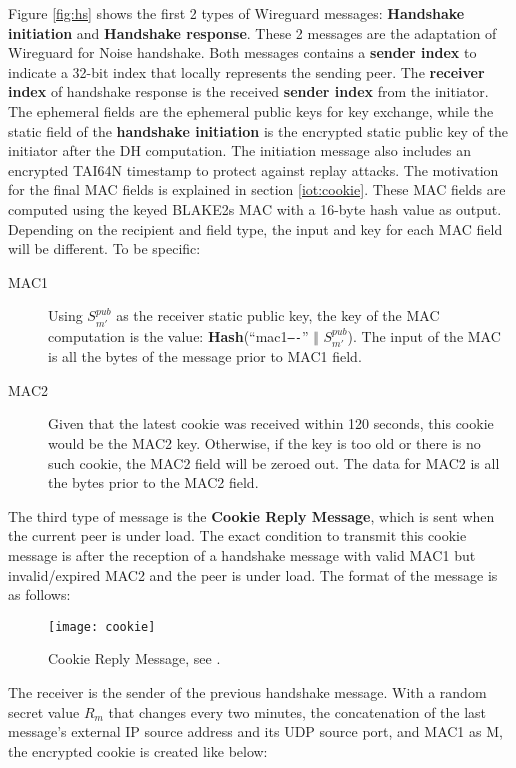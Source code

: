     Figure \ref{fig:hs} shows the first 2 types of Wireguard messages: \textbf{Handshake initiation} and
    \textbf{Handshake response}. These 2 messages are the adaptation of Wireguard for Noise
    handshake. Both messages contains a \textbf{sender index} to indicate a 32-bit index
    that locally represents the sending peer. The \textbf{receiver index} of handshake response
    is the received \textbf{sender index} from the initiator. The ephemeral fields are the
    ephemeral public keys for key exchange, while the static field of the \textbf{handshake initiation}
    is the encrypted static public key of the initiator after the DH computation. The initiation message
    also includes an encrypted TAI64N \cite{tai64} timestamp to protect against replay attacks. The motivation
    for the final MAC fields is explained in section \ref{iot:cookie}. These MAC fields are computed
    using the keyed BLAKE2s MAC with a 16-byte hash value as output. Depending on the recipient and
    field type, the input and key for each MAC field will be different. To be specific:
      \begin{description}
        \item[MAC1] Using $S^{pub}_{m'}$ as the receiver static public key, the key of the MAC computation
        is the value: \textbf{Hash}(``mac1\texttt{----}'' $\Vert$ $S^{pub}_{m'}$). The input of the MAC is all
        the bytes of the message prior to MAC1 field.
        \item[MAC2] Given that the latest cookie was received within 120 seconds, this cookie
        would be the MAC2 key. Otherwise, if the key is too old or there is no such cookie, the MAC2 
        field will be zeroed out. The data for MAC2 is all the bytes prior to the MAC2 field.
      \end{description}
    
   The third type of message is the \textbf{Cookie Reply Message}, which is sent when the current
   peer is under load. The exact condition to transmit this cookie message is after the reception
   of a handshake message with valid MAC1 but invalid/expired  MAC2 and the peer is under load.
   The format of the message is as follows:

    \begin{figure}[h]
      \centering
      \texttt{[image: cookie]}
      \caption{Cookie Reply Message, see \cite[p.~13]{wireguard}.}
      \label{fig:cookie}
    \end{figure} 

    The receiver is the sender of the previous handshake message. With a random secret value $R_m$ that changes
    every two minutes, the concatenation of the last message's external IP source address and its 
    UDP source port, and MAC1 as M, the encrypted cookie is created like below:

